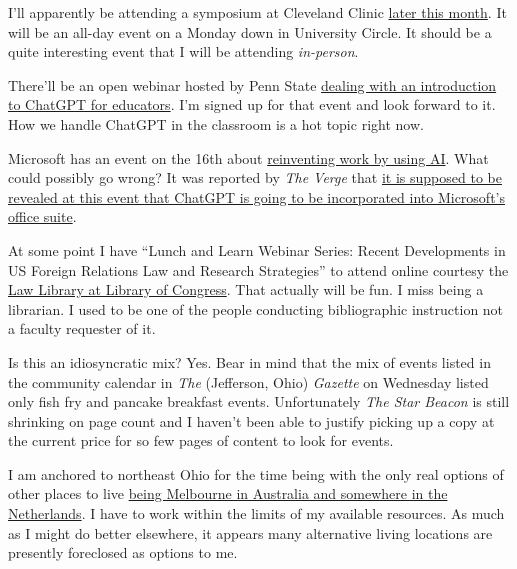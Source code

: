I'll apparently be attending a symposium at Cleveland Clinic
\href{https://www.clevelandclinicmeded.com/live/courses/pten2023/}{later
this month}. It will be an all-day event on a Monday down in University
Circle. It should be a quite interesting event that I will be attending
\emph{in-person}.

There'll be an open webinar hosted by Penn State
\href{https://networks.h-net.org/node/14775/discussions/12565541/h-teach-online-program-introduction-chatgpt}{dealing
with an introduction to ChatGPT for educators}. I'm signed up for that
event and look forward to it. How we handle ChatGPT in the classroom is
a hot topic right now.

Microsoft has an event on the 16th about
\href{https://news.microsoft.com/reinventing-productivity/}{reinventing
work by using AI}. What could possibly go wrong? It was reported by
\emph{The Verge} that
\href{https://www.theverge.com/2023/2/10/23593980/microsoft-bing-chatgpt-ai-teams-outlook-integration}{it
is supposed to be revealed at this event that ChatGPT is going to be
incorporated into Microsoft's office suite}.

At some point I have ``Lunch and Learn Webinar Series: Recent
Developments in US Foreign Relations Law and Research Strategies'' to
attend online courtesy the
\href{https://www.loc.gov/research-centers/law-library-of-congress/researcher-resources/legal-research-institute/united-states-law-webinars/?loclr=bloglaw}{Law
Library at Library of Congress}. That actually will be fun. I miss being
a librarian. I used to be one of the people conducting bibliographic
instruction not a faculty requester of it.

Is this an idiosyncratic mix? Yes. Bear in mind that the mix of events
listed in the community calendar in \emph{The} (Jefferson, Ohio)
\emph{Gazette} on Wednesday listed only fish fry and pancake breakfast
events. Unfortunately \emph{The Star Beacon} is still shrinking on page
count and I haven't been able to justify picking up a copy at the
current price for so few pages of content to look for events.

I am anchored to northeast Ohio for the time being with the only real
options of other places to live
\href{https://www.ptenresearch.org/for-researchers-and-professionals/projects-and-publications/}{being
Melbourne in Australia and somewhere in the Netherlands}. I have to work
within the limits of my available resources. As much as I might do
better elsewhere, it appears many alternative living locations are
presently foreclosed as options to me.

